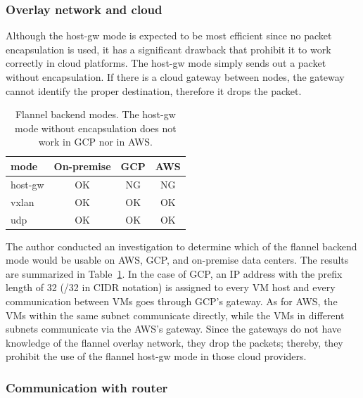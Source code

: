 \subsubsection{Overlay network and cloud}

Although the host-gw mode is expected to be most efficient since no packet encapsulation is used, it has a significant drawback that prohibit it to work correctly in cloud platforms. 
The host-gw mode simply sends out a packet without encapsulation.
If there is a cloud gateway between nodes, the gateway cannot identify the proper destination, therefore it drops the packet.

\begin{table}
  \centering
  \begin{tabular}{lccc}
    \toprule
    mode & On-premise & GCP & AWS \\
    \midrule
    host-gw & OK & NG & NG \\
    vxlan & OK & OK & OK \\
    udp & OK & OK & OK \\
    \bottomrule
  \end{tabular}

  \par\bigskip
  \centering
  \begin{minipage}{0.9\columnwidth}
    \caption[Flannel backend modes]{
      Flannel backend modes.
      The host-gw mode without encapsulation does not work in GCP nor in AWS.
    }
    \label{tab:Viable flannel backends}
  \end{minipage}
\end{table}

The author conducted an investigation to determine which of the flannel backend mode would be usable on AWS, GCP, and on-premise data centers.
The results are summarized in Table~\ref{tab:Viable flannel backends}. 
In the case of GCP, an IP address with the prefix length of 32 (/32 in CIDR notation) is assigned to every VM host and every communication between VMs goes through GCP's gateway.
As for AWS, the VMs within the same subnet communicate directly, while the VMs in different subnets communicate via the AWS's gateway.
Since the gateways do not have knowledge of the flannel overlay network, they drop the packets; thereby, 
they prohibit the use of the flannel host-gw mode in those cloud providers.  

\subsubsection{Communication with router}

